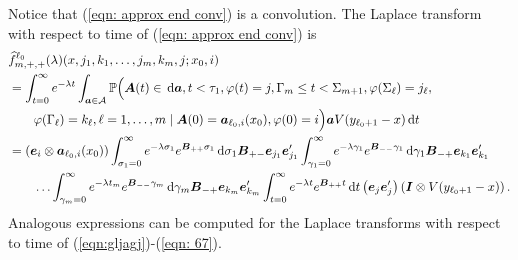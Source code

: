 Notice that (\ref{eqn: approx end conv}) is a convolution. The Laplace transform with respect to time of (\ref{eqn: approx end conv}) is
\begin{align}
	&\widehat f^{\ell_0}_{m,+,+}(\lambda)(x,j_1,k_1,\dots,j_m,k_m,j; x_0,i) \nonumber 
	\\&=\int_{t=0}^\infty e^{-\lambda t}\int_{\boldsymbol a \in\mathcal A}\mathbb P\Big(\boldsymbol A(t)\in \, \mathrm{d} \boldsymbol a, t<\tau_1, \varphi(t) = j, \Gamma_m\leq t<\Sigma_{m+1}, \nonumber
	\varphi(\Sigma_\ell) = j_\ell , 
	\\&\qquad\varphi(\Gamma_\ell) = k_\ell, \ell = 1,\dots,m \mid \boldsymbol A(0) = \boldsymbol   a_{\ell_0,i}(x_0), \varphi(0) = i\Big)\boldsymbol a V(y_{\ell_0+1}-x)\, \mathrm{d} t\nonumber
	\\&=(\boldsymbol e_i\otimes \boldsymbol  a_{\ell_0,i}(x_0))  \int_{\sigma_1=0}^\infty e^{-\lambda \sigma_1} e^{\boldsymbol{B}_{++}\sigma_1} \, \mathrm{d} \sigma_1 \boldsymbol{B}_{+{-}}\boldsymbol e_{j_1}\boldsymbol e_{j_1}'\nonumber
	\int_{\gamma_1=0}^\infty e^{-\lambda \gamma_1} e^{\boldsymbol{B}_{--}\gamma_1} \, \mathrm{d} \gamma_1\boldsymbol{B}_{-{+}}\boldsymbol e_{k_1}\boldsymbol e_{k_1}'
	\\&\qquad\hdots 
	\int_{\gamma_m=0}^\infty e^{-\lambda t_m}e^{\boldsymbol{B}_{--}\gamma_m} \, \mathrm{d} \gamma_m\boldsymbol{B}_{-{+}}\boldsymbol e_{k_m}\boldsymbol e_{k_m}'
	\int_{t=0}^\infty e^{-\lambda t}e^{\boldsymbol{B}_{++}t} \, \mathrm{d} t 
	\left(\boldsymbol e_j\boldsymbol e_j' \right)\left(\boldsymbol I \otimes V(y_{\ell_0+1}-x)\right). \label{eqn: approx end conv lst}
\end{align}
Analogous expressions can be computed for the Laplace transforms with respect to time of (\ref{eqn:gljagj})-(\ref{eqn: 67}). 


